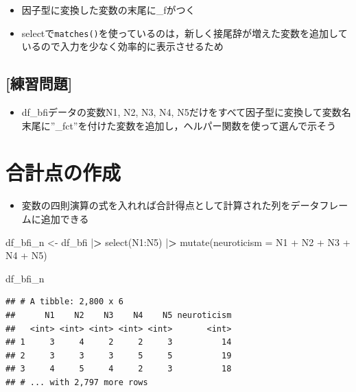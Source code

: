 \documentclass[
  xelatex,ja=standard, b5paper]{bxjsbook}
\newenvironment{Shaded}{\begin{snugshade}}{\end{snugshade}}
\newcommand{\AttributeTok}[1]{\textcolor[rgb]{0.77,0.63,0.00}{#1}}
\newcommand{\ErrorTok}[1]{\textcolor[rgb]{0.64,0.00,0.00}{\textbf{#1}}}
\newcommand{\FunctionTok}[1]{\textcolor[rgb]{0.00,0.00,0.00}{#1}}
\newcommand{\NormalTok}[1]{#1}
\newcommand{\OtherTok}[1]{\textcolor[rgb]{0.56,0.35,0.01}{#1}}
\newcommand{\SpecialCharTok}[1]{\textcolor[rgb]{0.00,0.00,0.00}{#1}}
\providecommand{\tightlist}{%
  \setlength{\itemsep}{0pt}\setlength{\parskip}{0pt}}
\begin{document}
\begin{itemize}
\tightlist
\item
  因子型に変換した変数の末尾に\_fがつく
\item
  selectで\texttt{matches()}を使っているのは，新しく接尾辞が増えた変数を追加しているので入力を少なく効率的に表示させるため
\end{itemize}

\hypertarget{ux7df4ux7fd2ux554fux984c-11}{%
\subsection{{[}練習問題{]}}\label{ux7df4ux7fd2ux554fux984c-11}}

\begin{itemize}
\tightlist
\item
  df\_bfiデータの変数N1, N2, N3, N4, N5だけをすべて因子型に変換して変数名末尾に''\_fct''を付けた変数を追加し，ヘルパー関数を使って選んで示そう
\end{itemize}

\hypertarget{mu-total}{%
\section{合計点の作成}\label{mu-total}}

\begin{itemize}
\tightlist
\item
  変数の四則演算の式を入れれば合計得点として計算された列をデータフレームに追加できる
\end{itemize}

\begin{Shaded}
\begin{Highlighting}[]
\NormalTok{df\_bfi\_n }\OtherTok{\textless{}{-}} 
\NormalTok{  df\_bfi }\SpecialCharTok{|}\ErrorTok{\textgreater{}}
  \FunctionTok{select}\NormalTok{(N1}\SpecialCharTok{:}\NormalTok{N5) }\SpecialCharTok{|}\ErrorTok{\textgreater{}}                       
  \FunctionTok{mutate}\NormalTok{(}\AttributeTok{neuroticism =}\NormalTok{ N1 }\SpecialCharTok{+}\NormalTok{ N2 }\SpecialCharTok{+}\NormalTok{ N3 }\SpecialCharTok{+}\NormalTok{ N4 }\SpecialCharTok{+}\NormalTok{ N5)}
  
\NormalTok{df\_bfi\_n}
\end{Highlighting}
\end{Shaded}

\begin{verbatim}
## # A tibble: 2,800 x 6
##      N1    N2    N3    N4    N5 neuroticism
##   <int> <int> <int> <int> <int>       <int>
## 1     3     4     2     2     3          14
## 2     3     3     3     5     5          19
## 3     4     5     4     2     3          18
## # ... with 2,797 more rows
\end{verbatim}
\end{document}
